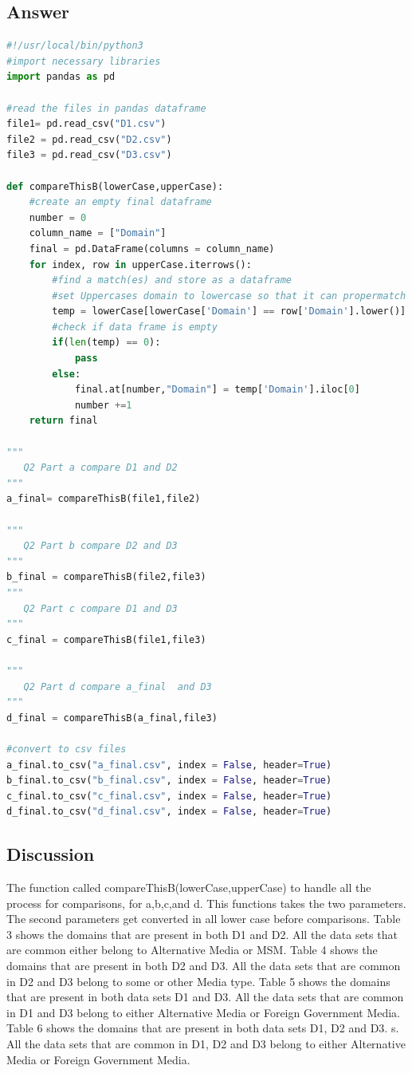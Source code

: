 \documentclass[12pt]{article}
\begin{document}
\subsection*{Answer}
\begin{lstlisting}[language=Python, caption=two.py , label=lst:copy]
#!/usr/local/bin/python3
#import necessary libraries
import pandas as pd

#read the files in pandas dataframe
file1= pd.read_csv("D1.csv")
file2 = pd.read_csv("D2.csv")
file3 = pd.read_csv("D3.csv")

def compareThisB(lowerCase,upperCase):
    #create an empty final dataframe 
    number = 0
    column_name = ["Domain"]
    final = pd.DataFrame(columns = column_name)
    for index, row in upperCase.iterrows():
        #find a match(es) and store as a dataframe
        #set Uppercases domain to lowercase so that it can propermatch
        temp = lowerCase[lowerCase['Domain'] == row['Domain'].lower()]
        #check if data frame is empty
        if(len(temp) == 0):
            pass
        else:
            final.at[number,"Domain"] = temp['Domain'].iloc[0]
            number +=1
    return final

"""
   Q2 Part a compare D1 and D2
"""
a_final= compareThisB(file1,file2)

"""
   Q2 Part b compare D2 and D3
"""
b_final = compareThisB(file2,file3)
"""
   Q2 Part c compare D1 and D3
"""
c_final = compareThisB(file1,file3)

"""
   Q2 Part d compare a_final  and D3
"""
d_final = compareThisB(a_final,file3)

#convert to csv files
a_final.to_csv("a_final.csv", index = False, header=True)
b_final.to_csv("b_final.csv", index = False, header=True)
c_final.to_csv("c_final.csv", index = False, header=True)
d_final.to_csv("d_final.csv", index = False, header=True)

\end{lstlisting}
\subsection*{Discussion}
The function called compareThisB(lowerCase,upperCase) to handle all the process for comparisons, for a,b,c,and d. This functions takes the two parameters. The second parameters get converted in all lower case before comparisons. Table 3 shows the domains that are present in both D1 and D2. All the data sets that are common either belong to Alternative Media or MSM. Table 4 shows the domains that are present in both D2 and D3. All the data sets that are common in D2 and D3 belong to some or other Media type. Table 5 shows the domains that are present in both data sets D1 and D3. All the data sets that are common in D1 and D3 belong to either Alternative Media or Foreign Government Media. Table 6 shows the domains that are present in both data sets D1, D2 and D3. s. All the data sets that are common in D1, D2 and D3 belong to either Alternative Media or Foreign Government Media.
\end{document}
